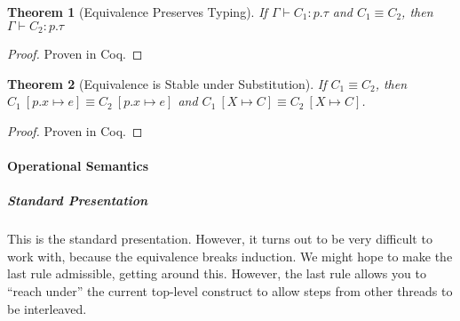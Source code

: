 \documentclass{article}
\newtheorem{thm}{Theorem}
\theoremstyle{definition}
\newcommand{\ett}{\textsf{true}}
\newcommand{\eff}{\textsf{false}}
\newcommand{\To}{\Rightarrow}
\newcommand{\subst}[3]{#1~[#2 \mapsto #3]}
\newcommand{\ceq}{\equiv}
\newcommand{\own}[2]{#1.#2}
\newcommand{\send}[3][]{#2\nolinebreak \mathrel{\xrightarrow{#1}}\nolinebreak #3}
\newcommand{\cif}[3]{\textsf{if}~#1 \mathrel{\textsf{then}}\nolinebreak #2 \mathrel{\textsf{else}}\nolinebreak #3}
\newcommand{\clet}[2]{\textsf{let}~#1\nolinebreak =\nolinebreak #2 \mathrel{\textsf{in}}}
\newcommand{\proves}{\vdash}
\begin{document}
\begin{thm}[Equivalence Preserves Typing]
  \label{thm:equiv-pres-types}
  If $\Gamma \proves C_1 : p.\tau$ and $C_1 \ceq C_2$, then $\Gamma \proves C_2 : p.\tau$
\end{thm}
\begin{proof}
  Proven in Coq.
\end{proof}

\begin{thm}[Equivalence is Stable under Substitution]
  \label{thm:equiv-stable-subst}
  If $C_1 \ceq C_2$, then $\subst{C_1}{\own{p}{x}}{e} \ceq \subst{C_2}{\own{p}{x}}{e}$ and $\subst{C_1}{X}{C} \ceq \subst{C_2}{X}{C}$.
\end{thm}
\begin{proof}
  Proven in Coq.
\end{proof}

\paragraph{Operational Semantics}


\subparagraph{Standard Presentation}
\noindent{}

This is the standard presentation.
However, it turns out to be very difficult to work with, because the equivalence breaks induction.
We might hope to make the last rule admissible, getting around this.
However, the last rule allows you to ``reach under'' the current top-level construct to allow steps from other threads to be interleaved.
\end{document}
